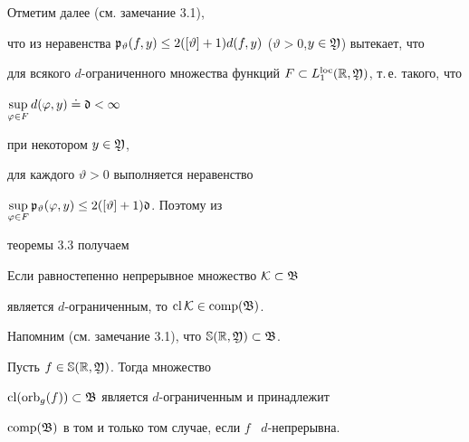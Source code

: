Отметим далее (см. замечание 3.1),


что из неравенства $\frak p_\vartheta(f,y)\le


2([\vartheta]+1)d(f,y)$ ($\vartheta>0$,\linebreak $y\in\frak Y$) вытекает, что


для всякого $d$-ограниченного множества функций $F\subset


L_1^{\loc}(\Bbb R,\frak Y)$, т.\,е. такого, что


$\sup\limits_{\varphi\in F}d(\varphi,y)\doteq\frak d<\infty$


при некотором $y\in\frak Y$,


для каждого $\vartheta>0$ выполняется неравенство


$\sup\limits_{\varphi\in F}\frak p_\vartheta(\varphi,y)


\le2([\vartheta]+1)\frak d$. Поэтому из


теоремы 3.3 получаем








\begin{cors}


Если равностепенно непрерывное множество $\cal K\subset\frak B$


является $d$-огра\-ни\-чен\-ным, то $\operatorname{cl}\cal K\in\operatorname{comp}(\frak B)$.


\end{cors}





Напомним (см. замечание 3.1), что $\Bbb S(\Bbb R,\frak Y)\subset\frak B$.








\begin{thms}


Пусть $f\in\Bbb S(\Bbb R,\frak Y)$. Тогда множество


$\operatorname{cl}(\operatorname{orb}_g(f))\subset\frak B$ является $d$-огра\-ни\-чен\-ным и принадлежит 


$\operatorname{comp}(\frak B)$ в том и только том случае, если $f$ \ $d$-непрерывна.


\end{thms}








